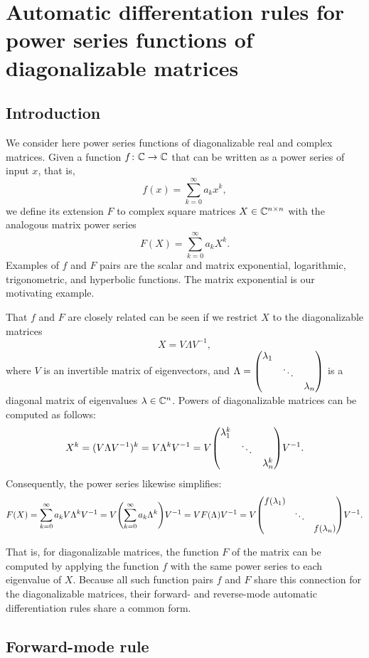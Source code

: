 \documentclass[../../main.tex]{subfiles}
\begin{document}
\chapter{Automatic differentation rules for power series functions of diagonalizable matrices}\label{ad-power-series}

\begin{refsection}

	\section{Introduction}\label{introduction-1}

	We consider here power series functions of diagonalizable real and complex matrices.
	Given a function $f \colon \mathbb{C} \to \mathbb{C}$ that can be written as a power series of input $x$, that is,
	\[f(x) = \sum_{k=0}^\infty a_k x^k,\]
	we define its extension $F$ to complex square matrices $X \in \mathbb{C}^{n \times n}$ with the analogous matrix power series
	\[F(X) = \sum_{k=0}^\infty a_k X^k.\]
	Examples of $f$ and $F$ pairs are the scalar and matrix exponential, logarithmic, trigonometric, and hyperbolic functions.
	The matrix exponential is our motivating example.

	That $f$ and $F$ are closely related can be seen if we restrict $X$ to the diagonalizable matrices
	\[X = V \Lambda V^{-1},\]
	where $V$ is an invertible matrix of eigenvectors, and
	$\Lambda = \mqty(\dmat{\lambda_1, \ddots, \lambda_n})$
	is a diagonal matrix of eigenvalues $\lambda \in \mathbb{C}^{n}$.
	Powers of diagonalizable matrices can be computed as follows:
	$$X^k = (V \Lambda V^{-1})^k = V \Lambda^k V^{-1} = V \mqty(\dmat{\lambda_1^k, \ddots, \lambda_n^k}) V^{-1}.$$
	Consequently, the power series likewise simplifies:
	\[F(X) = \sum_{k=0}^\infty a_k V \Lambda^k V^{-1} = V \qty( \sum_{k=0}^\infty a_k \Lambda^k ) V^{-1} = V F(\Lambda) V^{-1} = V \mqty(\dmat{f(\lambda_1), \ddots, f(\lambda_n)}) V^{-1}.\]

	That is, for diagonalizable matrices, the function $F$ of the matrix can be computed by applying the function $f$ with the same power series to each eigenvalue of $X$.
	Because all such function pairs $f$ and $F$ share this connection for the diagonalizable matrices, their forward- and reverse-mode automatic differentiation rules share a common form.

	\clearpage %
	\section{Forward-mode rule}\label{forward-mode-rule-1}


\end{refsection}
\end{document}
